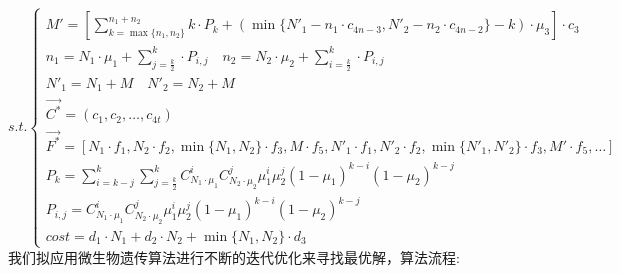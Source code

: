 \documentclass[withoutpreface,bwprint]{cumcmthesis} %
\begin{document}
\begin{equation*}
	s.t.\begin{cases}
		M'=[\sum_{k=\max \{n_{1},n_{2}\}}^{n_{1}+n_{2}}k\cdot P_{k}+(\min \{N'_{1}-n_{1}\cdot c_{4n-3},N'_{2}-n_{2}\cdot c_{4n-2}\}-k)\cdot \mu_{3}]\cdot c_{3}                                \\
		n_{1}=N_{1}\cdot \mu_{1}+\sum_{j=\frac{k}{2}}^{k}\cdot P_{i,j} \quad n_{2}=N_{2}\cdot \mu_{2}+\sum_{i=\frac{k}{2}}^{k}\cdot P_{i,j}                                                    \\
		N'_{1}=N_{1}+M \quad N'_{2}=N_{2}+M                                                                                                                                                    \\
		\vec{C^{*}}=(c_{1},c_{2},\dots,c_{4t})                                                                                                                                                 \\
		\vec{F^{*}}=[N_{1}\cdot f_{1},N_{2}\cdot f_{2},\min \{N_{1},N_{2}\}\cdot f_{3},M\cdot f_{5},N'_{1}\cdot f_{1},N'_{2}\cdot f_{2},\min \{N'_{1},N'_{2}\}\cdot f_{3},M'\cdot f_{5},\dots] \\
		P_{k}=\sum_{i=k-j}^{k}\sum_{j=\frac{k}{2}}^{k}C_{N_{1}\cdot\mu_{1}}^{i}C_{N_{2}\cdot\mu_{2}}^{j}\mu_{1}^{i}\mu_{2}^{j}(1-\mu_{1})^{k-i}(1-\mu_{2})^{k-j}                               \\
		P_{i,j}=C_{N_{1}\cdot\mu_{1}}^{i}C_{N_{2}\cdot\mu_{2}}^{j}\mu_{1}^{i}\mu_{2}^{j}(1-\mu_{1})^{k-i}(1-\mu_{2})^{k-j}                                                                     \\
		cost=d_{1}\cdot N_{1}+d_{2}\cdot N_{2}+\min \{ N_{1},N_{2}\}\cdot d_{3}
	\end{cases}
\end{equation*}
我们拟应用微生物遗传算法进行不断的迭代优化来寻找最优解，算法流程:
\end{document}
